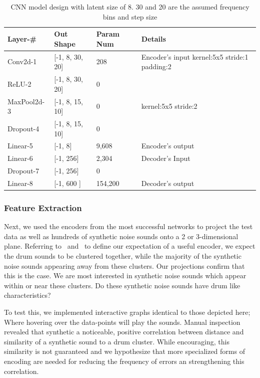 \documentclass[\main/thesis.tex]{subfiles}
\begin{document}
\begin{table}[h!]
\label{table:hyper_prams}
\begin{tabular}{|p{28mm}|p{25mm}|p{23mm}|p{50mm}|}
\hline
Layer-\# & Out Shape & Param Num & Details  \\ \hline
Conv2d-1 & [-1, 8, 30, 20] &   208 & Encoder's input \newline
kernel:5x5\newline                  
stride:1\newline    
padding:2 \\ \hline
ReLU-2 & [-1, 8, 30, 20] &   0 & \\  \hline
MaxPool2d-3 & [-1, 8, 15, 10] & 0 &  kernel:5x5 \newline
stride:2 \\ \hline
Dropout-4 & [-1, 8, 15, 10] & 0 &  \\ \hline
Linear-5 & [-1, 8] & 9,608 & Encoder's output \\ \hline
Linear-6 & [-1, 256] & 2,304 & Decoder's Input \\ \hline
Dropout-7 & [-1, 256] & 0 &  \\ \hline
Linear-8 & [-1, 600 ] &  154,200& Decoder's output\\ \hline
\end{tabular}
\caption{CNN model design with latent size of 8. 30 and 20 are the assumed frequency bins and step size}
\end{table}


\subsubsection{Feature Extraction}
Next, we used the encoders from the most successful networks to project the test data as well as hundreds of synthetic noise sounds onto a 2 or 3-dimensional plane. Referring to~ and~ to define our expectation of a useful encoder, we expect the drum sounds to be clustered together, while the majority of the synthetic noise sounds appearing away from these clusters. Our projections confirm that this is the case. We are most interested in synthetic noise sounds which appear within or near these clusters. Do these synthetic noise sounds have drum like characteristics? 

To test this, we implemented interactive graphs identical to those depicted here; Where hovering over the data-points will play the sounds. Manual inspection revealed that synthetic a noticeable, positive correlation between distance and similarity of a synthetic sound to a drum cluster. While encouraging, this similarity is not guaranteed and we hypothesize that more specialized forms of encoding are needed for reducing the frequency of errors an strengthening this correlation.
\end{document}
